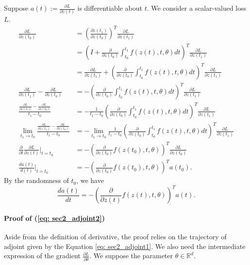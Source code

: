 Suppose $a(t):=\frac{\partial L}{\partial z(t)}$ is differentiable about $t$. 
We consider a scalar-valued loss $L$. 
\begin{align*}
    \frac{\partial L}{\partial z(t_0)} &= (\frac{\partial z(t_1)}{\partial z(t_0)})^T\frac{\partial L}{\partial z(t_1)} \\
                                       &= \left(I+\frac{\partial}{\partial z(t_0)}\int_{t_0}^{t_1} f(z(t),t,\theta)dt\right)^T\frac{\partial L}{\partial z(t_1)} \\
                                       &= \frac{\partial L}{\partial z(t_1)} + \left(\frac{\partial}{\partial z(t_0)}\int_{t_0}^{t_1} f(z(t),t,\theta)dt\right)^T\frac{\partial L}{\partial z(t_1)} \\
    \frac{\partial L}{\partial z(t_1)}-\frac{\partial L}{\partial z(t_0)} &= -\left(\frac{\partial}{\partial z(t_0)}\int_{t_0}^{t_1} f(z(t),t,\theta)dt\right)^T\frac{\partial L}{\partial z(t_1)} \\
    \frac{\frac{\partial L}{\partial z(t_1)}-\frac{\partial L}{\partial z(t_0)}}{t_1-t_0} &= -\frac{1}{t_1-t_0}\left(\frac{\partial}{\partial z(t_0)}\int_{t_0}^{t_1} f(z(t),t,\theta)dt\right)^T\frac{\partial L}{\partial z(t_1)} \\
    \lim_{t_1\rightarrow t_0} \frac{\frac{\partial L}{\partial z(t_1)}-\frac{\partial L}{\partial z(t_0)}}{t_1-t_0} &= -\lim_{t_1\rightarrow t_0}\frac{1}{t_1-t_0}\left(\frac{\partial}{\partial z(t_0)}\int_{t_0}^{t_1} f(z(t),t,\theta)dt\right)^T\frac{\partial L}{\partial z(t_1)} \\
    \frac{\partial}{\partial t}\frac{\partial L}{\partial z(t)}\bigg|_{t=t_0} &= -\left(\frac{\partial}{\partial z(t_0)}f(z(t_0),t,\theta)\right)^T\frac{\partial L}{\partial z(t_0)} \\
    \frac{da(t)}{d(t)}\bigg|_{t=t_0} &= -\left(\frac{\partial}{\partial z(t_0)}f(z(t_0),t,\theta)\right)^Ta(t_0).
\end{align*}
By the randomness of $t_0$, we have 
\begin{equation*}
    \frac{da(t)}{dt} = -\left(\frac{\partial}{\partial z(t)}f(z(t),t,\theta)\right)^Ta(t).
\end{equation*}

\paragraph{Proof of (\ref{eq: sec2_adjoint2})}
Aside from the definition of derivative, the proof relies on the trajectory of adjoint given by the Equation \ref{eq: sec2_adjoint1}. 
We also need the intermediate expression of the gradient $\frac{\partial L}{\partial\theta}$. 
We suppose the parameter $\theta\in\mathbb{R}^d$.

